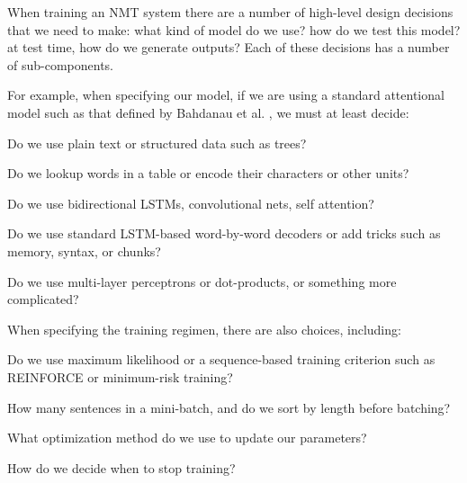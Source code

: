 \documentclass[]{article}
\begin{document}
When training an NMT system there are a number of high-level design decisions that we need to make: what kind of model do we use? how do we test this model? at test time, how do we generate outputs?
Each of these decisions has a number of sub-components.

For example, when specifying our model, if we are using a standard attentional model such as that defined by Bahdanau et al. \citep{Bahdanau2014}, we must at least decide:
\begin{description}
\setlength{\itemsep}{0.5pt}
\item[Input Data Format:] Do we use plain text or structured data such as trees?
\item[Embedding Method:] Do we lookup words in a table or encode their characters or other units?
\item[Encoder:] Do we use bidirectional LSTMs, convolutional nets, self attention?
\item[Decoder:] Do we use standard LSTM-based word-by-word decoders or add tricks such as memory, syntax, or chunks?
\item[Attention Method:] Do we use multi-layer perceptrons or dot-products, or something more complicated?
\end{description}

\noindent
When specifying the training regimen, there are also choices, including:
\begin{description}
\setlength{\itemsep}{0.5pt}
\item[Loss Function:] Do we use maximum likelihood or a sequence-based training criterion such as REINFORCE or minimum-risk training?
\item[Batching:] How many sentences in a mini-batch, and do we sort by length before batching?
\item[Optimizer:] What optimization method do we use to update our parameters?
\item[Stopping Criterion:] How do we decide when to stop training?
\end{description}
\end{document}
